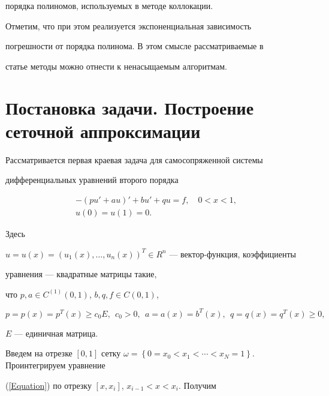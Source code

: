 порядка полиномов, используемых в методе коллокации.


Отметим, что при этом реализуется экспоненциальная зависимость


погрешности от порядка полинома. В этом смысле рассматриваемые в


статье методы можно отнести к ненасыщаемым алгоритмам.





\section{Постановка задачи. Построение сеточной аппроксимации}





Рассматривается первая краевая задача для самосопряженной системы


дифференциальных уравнений второго порядка


\begin{gather} \label{Equation}


- (pu'+au)'+bu'+qu=f,\quad 0 < x < 1, \\


\label{BdCond}


u(0)=u(1)=0.


\end{gather}


Здесь


$u=u(x)=(u_1(x),\dotsc,u_n(x))^T\in R^n$ --- вектор-функция, коэффициенты


уравнения --- квадратные матрицы такие,


что $p, a \in C^{(1)}(0,1)$, $b, q, f\in C(0,1)$,


\begin{equation} \label{Symmetry}


p=p(x)=p^T(x)\ge c_0 E,


\ \ c_0 >0,\ \ a=a(x)=b^T(x),\ \ q=q(x)=q^T (x) \ge 0,


\end{equation}


$E$ --- единичная матрица.





Введем на отрезке $[0,1]$ сетку $\omega=\left\{ {0=x_0 <


x_1 < \dotsb < x_N=1} \right\}$. Проинтегрируем уравнение


(\ref{Equation}) по отрезку $[x,x_i]$, $x_{i-1} < x < x_i$. Получим


